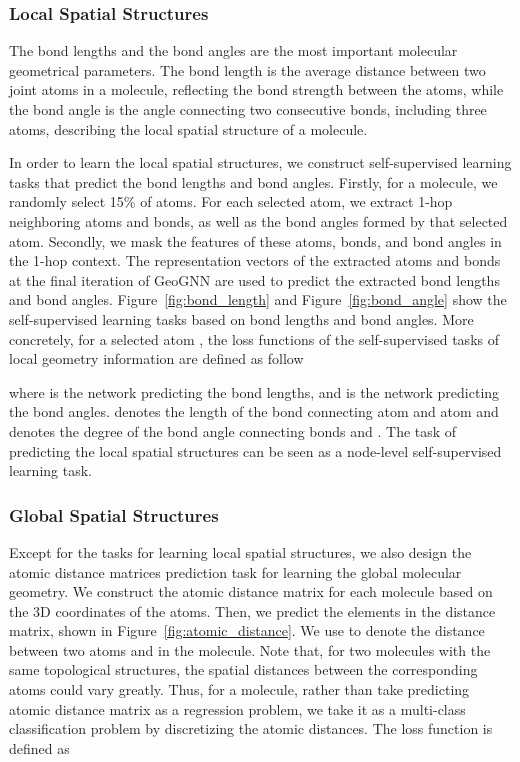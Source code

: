 \documentclass{article}
\begin{document}
\subsubsection{Local Spatial Structures}
The bond lengths and the bond angles are the most important molecular geometrical parameters. The bond length is the average distance between two joint atoms in a molecule, reflecting the bond strength between the atoms, while the bond angle is the angle connecting two consecutive bonds, including three atoms, describing the local spatial structure of a molecule. 

In order to learn the local spatial structures, we construct self-supervised learning tasks that predict the bond lengths and bond angles. Firstly, for a molecule, we randomly select 15\% of atoms. For each selected atom, we extract 1-hop neighboring atoms and bonds, as well as the bond angles formed by that selected atom. Secondly, we mask the features of these atoms, bonds, and bond angles in the 1-hop context. The representation vectors of the extracted atoms and bonds at the final iteration of GeoGNN are used to predict the extracted bond lengths and bond angles. Figure~\ref{fig:bond_length} and Figure~\ref{fig:bond_angle} show the self-supervised learning tasks based on bond lengths and bond angles. More concretely, for a selected atom , the loss functions of the self-supervised tasks of local geometry information are defined as follow

where  is the network predicting the bond lengths, and  is the network predicting the bond angles.  denotes the length of the bond connecting atom  and atom  and  denotes the degree of the bond angle connecting bonds  and . The task of predicting the local spatial structures can be seen as a node-level self-supervised learning task.

\subsubsection{Global Spatial Structures}
Except for the tasks for learning local spatial structures, we also design the atomic distance matrices prediction task for learning the global molecular geometry. We construct the atomic distance matrix for each molecule based on the 3D coordinates of the atoms. Then, we predict the elements in the distance matrix, shown in Figure~\ref{fig:atomic_distance}. We use  to denote the distance between two atoms  and  in the molecule.
Note that, for two molecules with the same topological structures, the spatial distances between the corresponding atoms could vary greatly. Thus, for a molecule, rather than take predicting atomic distance matrix as a regression problem, we take it as a multi-class classification problem by discretizing the atomic distances. The loss function is defined as
\end{document}
